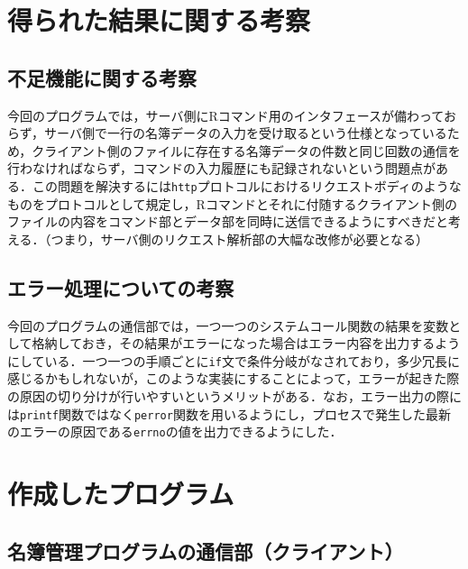 \documentclass[11pt]{jsarticle}
\begin{document}
\section{得られた結果に関する考察}

\subsection{不足機能に関する考察}

今回のプログラムでは，サーバ側にRコマンド用のインタフェースが備わっておらず，サーバ側で一行の名簿データの入力を受け取るという仕様となっているため，クライアント側のファイルに存在する名簿データの件数と同じ回数の通信を行わなければならず，コマンドの入力履歴にも記録されないという問題点がある．この問題を解決するには{\tt http}プロトコルにおけるリクエストボディのようなものをプロトコルとして規定し，Rコマンドとそれに付随するクライアント側のファイルの内容をコマンド部とデータ部を同時に送信できるようにすべきだと考える．（つまり，サーバ側のリクエスト解析部の大幅な改修が必要となる）

\subsection{エラー処理についての考察}

今回のプログラムの通信部では，一つ一つのシステムコール関数の結果を変数として格納しておき，その結果がエラーになった場合はエラー内容を出力するようにしている．一つ一つの手順ごとに{\tt if}文で条件分岐がなされており，多少冗長に感じるかもしれないが，このような実装にすることによって，エラーが起きた際の原因の切り分けが行いやすいというメリットがある．なお，エラー出力の際には{\tt printf}関数ではなく{\tt perror}関数を用いるようにし，プロセスで発生した最新のエラーの原因である{\tt errno}の値を出力できるようにした．

\section{作成したプログラム}

\subsection{名簿管理プログラムの通信部（クライアント）} \label{sec:client.c}
\end{document}
